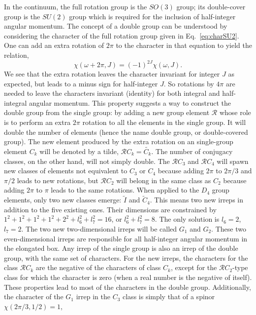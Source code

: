 \documentclass[aps,prd,reprint,showpacs,floatfix,longbibliography,,superscriptaddress]{revtex4-1}
\def\beq{\begin{equation}}
\def\eeq{\end{equation}}
\begin{document}
\begin{widetext}
In the continuum, the full rotation group is the $SO(3)$ group; its double-cover group is the $SU(2)$ group 
which is required for the inclusion of half-integer angular momentum.
The concept of a double group can be understood by considering the 
character of the full rotation group given in Eq.~\ref{eq:charSU2}. 
One can add an extra rotation of $2\pi$ to the character  in that equation to yield the relation, 
\beq
\chi(\omega+2\pi,J)= (-1)^{2J}\chi(\omega,J). 
\eeq
We see that the extra rotation leaves the character invariant for integer $J$ as expected, 
but leads to a minus sign for half-integer $J$. 
So rotations by $4\pi$ are needed to leave the characters invariant (identity) 
for both integral and half-integral angular momentum.
This property suggests a way to construct the double group from the single group:  
by adding a new group element $\mathcal{R}$ whose role is to perform an extra $2\pi$ rotation 
to all the elements in the single group. 
It will double the number of elements (hence the name double group, or double-covered group).
The new element produced by the extra rotation on an single-group element $C_k$ will be denoted by a tilde, 
$\mathcal{R}C_k=\widetilde{C_k}$.
The number of conjugacy classes, on the other hand,  will not simply double.
The $\mathcal{R}C_3$ and $\mathcal{R}C_4$ will spawn new classes of elements not equivalent to
$C_3$ or $C_4$
because adding $2\pi$ to $2\pi/3$ and $\pi/2$ leads to new rotations, 
but $\mathcal{R}C_2$ will belong in the same class as $C_2$ because adding $2\pi$ to $\pi$ leads to the same rotations.
When applied to the $D_4$ group elements, only two new classes emerge: $\widetilde{I}$ and $\widetilde{C}_4$.
This means two new irreps in addition to the five existing ones. Their dimensions are constrained by  
$1^2 + 1^2 + 1^2 + 1^2 +2^2 + l_6^2 + l_7^2 = 16$, or $ l_6^2 + l_7^2= 8$.
The only solution is $l_6=2$, $l_7=2$. The two new two-dimensional irreps will be called $G_1$ and $G_2$.
These two even-dimensional irreps are responsible for all half-integer angular momentum in the elongated box.
Any irrep of the single group is also an irrep of the double group, with the same set of characters.
For the new irreps, the characters for the class $\mathcal{R}C_k$ are the negative of the characters of class $C_k$,
except for the $\mathcal{R}C_2$-type class for which the character is zero (when a real number is the negative of itself).
These properties lead to most of the characters in the double group. 
Additionally, the character of the $G_1$ irrep in the ${C}_3$ class is simply that of a spinor $\chi(2\pi/3,1/2)=1$, 

\end{widetext}
\end{document}
